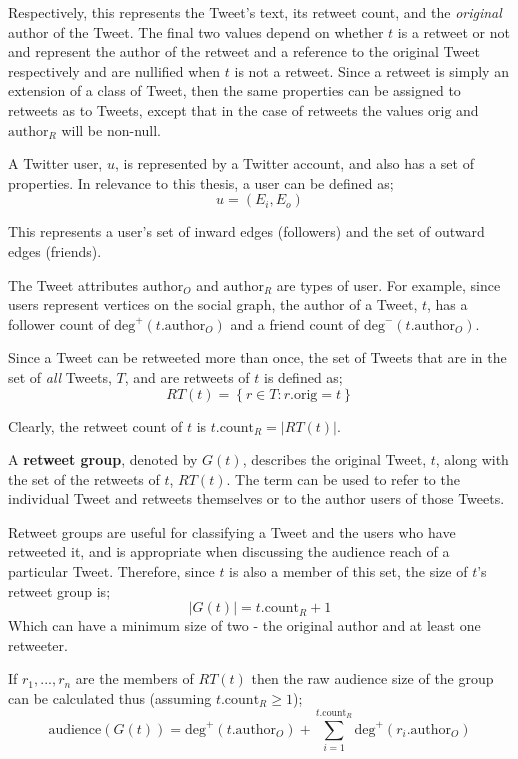 Respectively, this represents the Tweet's text, its retweet count, and the \textit{original} author of the Tweet. The final two values depend on whether $t$ is a retweet or not and represent the author of the retweet and a reference to the original Tweet respectively and are nullified when $t$ is not a retweet. Since a retweet is simply an extension of a class of Tweet, then the same properties can be assigned to retweets as to Tweets, except that in the case of retweets the values $\mathrm{orig}$ and $\mathrm{author}_R$ will be non-null.

A Twitter user, $u$, is represented by a Twitter account, and also has a set of properties. In relevance to this thesis, a user can be defined as;
\[
    u = (E_i, E_o)
\]

This represents a user's set of inward edges (followers) and the set of outward edges (friends).

The Tweet attributes $\mathrm{author}_O$ and $\mathrm{author}_R$ are types of user. For example, since users represent vertices on the social graph, the author of a Tweet, $t$, has a follower count of $\textrm{deg}^+(t.\textrm{author}_O)$ and a friend count of $\textrm{deg}^-(t.\textrm{author}_O)$.

Since a Tweet can be retweeted more than once, the set of Tweets that are in the set of \textit{all} Tweets, $T$, and are retweets of $t$ is defined as;
\[
	RT(t) = \left\{ r \in T : r.\textrm{orig} = t \right\}
\]

Clearly, the retweet count of $t$ is $ t.\mathrm{count}_R = \left\vert{RT(t)}\right\vert $.


\begin{mydefinition}
A \textbf{retweet group}, denoted by $G(t)$, describes the original Tweet, $t$, along with the set of the retweets of $t$, $RT(t)$. The term can be used to refer to the individual Tweet and retweets themselves or to the author users of those Tweets.
\end{mydefinition}


Retweet groups are useful for classifying a Tweet and the users who have retweeted it, and is appropriate when discussing the audience reach of a particular Tweet. Therefore, since $t$ is also a member of this set, the size of $t$'s retweet group is; 
\[
	\left\vert{G(t)}\right\vert = t.\mathrm{count}_R + 1 
\] 
Which can have a minimum size of two - the original author and at least one retweeter.
 
If $ r_1,...,r_n $ are the members of $RT(t)$ then the raw audience size of the group can be calculated thus (assuming $t.\textrm{count}_R \geq 1$);
\[
	\textrm{audience}(G(t)) = \textrm{deg}^+(t.\textrm{author}_O) + \sum\limits_{i=1}^{t.\mathrm{count}_R} \textrm{deg}^+(r_i.\textrm{author}_O)
\]

